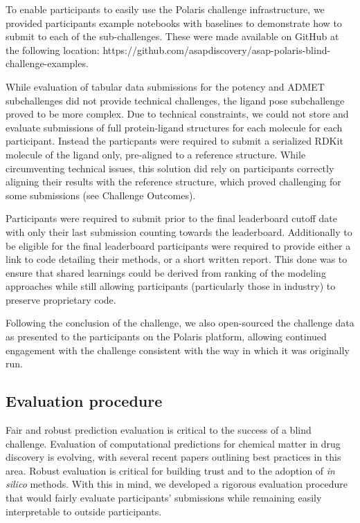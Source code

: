 \documentclass[journal=jcim,manuscript=article]{achemso}
\begin{document}
To enable participants to easily use the Polaris challenge infrastructure, we provided participants example notebooks with baselines to demonstrate how to submit to each of the sub-challenges. These were made available on GitHub at the following location: https://github.com/asapdiscovery/asap-polaris-blind-challenge-examples. 

While evaluation of tabular data submissions for the potency and ADMET subchallenges did not provide technical challenges, the ligand pose subchallenge proved to be more complex. Due to technical constraints, we could not store and evaluate submissions of full protein-ligand structures for each molecule for each participant. Instead the particpants were required to submit a serialized RDKit molecule of the ligand only, pre-aligned to a reference structure. While circumventing technical issues, this solution did rely on participants correctly aligning their results with the reference structure, which proved challenging for some submissions (see Challenge Outcomes).


Participants were required to submit prior to the final leaderboard cutoff date with only their last submission counting towards the leaderboard. Additionally to be eligible for the final leaderboard participants were required to provide either a link to code detailing their methods, or a short written report. This done was to ensure that shared learnings could be derived from ranking of the modeling approaches while still allowing participants (particularly those in industry) to preserve proprietary code. 

Following the conclusion of the challenge, we also open-sourced the challenge data as presented to the participants on the Polaris platform, allowing continued engagement with the challenge consistent with the way in which it was originally run. 


\subsection{Evaluation procedure}    

Fair and robust prediction evaluation is critical to the success of a blind challenge. Evaluation of computational predictions for chemical matter in drug discovery is evolving, with several recent papers outlining best practices in this area.  Robust evaluation is critical for building trust and to the adoption of \textit{ in silico} methods. With this in mind, we developed a rigorous evaluation procedure that would fairly evaluate participants' submissions while remaining easily interpretable to outside participants.
\end{document}
